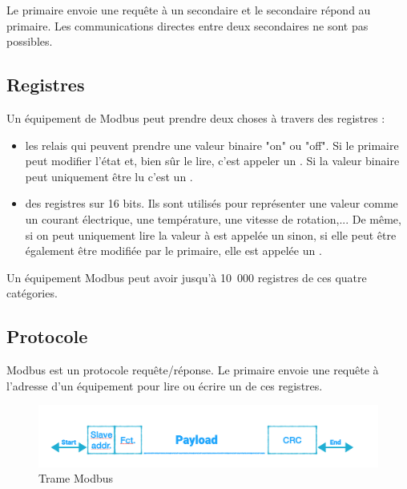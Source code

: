    \vspace{1em}


 Le primaire envoie une requête à un secondaire et le secondaire répond au primaire. Les communications directes entre deux secondaires ne sont pas possibles. 
 
 \subsection{Registres}
 
 
 Un équipement de Modbus peut prendre deux choses à travers des registres : 
 \begin{itemize}
     \item les relais qui peuvent prendre une valeur binaire "on" ou "off". Si le primaire peut modifier l'état et, bien sûr le lire, c'est appeler un \textit{}. Si la valeur binaire peut uniquement être lu c'est un \textit{}.
     \item des registres sur 16 bits. Ils sont utilisés pour représenter une valeur comme un courant électrique, une température, une vitesse de rotation,... De même, si on peut uniquement lire la valeur à est appelée un \textit{} sinon, si elle peut être également être modifiée par le primaire, elle est appelée un \textit{}.
 \end{itemize}
 
    \vspace{1em}

 
Un équipement Modbus peut avoir jusqu'à 10~000 registres de ces quatre catégories. 

\subsection{Protocole}

Modbus est un protocole requête/réponse. Le primaire envoie une requête à l'adresse d'un équipement pour lire ou écrire un de ces registres. 
\begin{figure}[tbp]
\centerline{\includegraphics[width=1\columnwidth]{Pictures/Capture37.png}}
\caption{Trame Modbus}
\label{fig-modbus2}
\end{figure}

